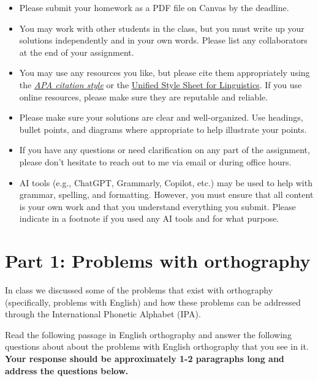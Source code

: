 \documentclass[12pt, letterpaper]{article}
\begin{document}
\begin{tcolorbox}[colback=LightGray!10!white,colframe=LightGray!75!black,title=Instructions]
    \begin{itemize}
        \item Please submit your homework as a PDF file on Canvas by the deadline.
        \item You may work with other students in the class, but you must write up your solutions independently and in your own words. Please list any collaborators at the end of your assignment.
        \item You may use any resources you like, but please cite them appropriately using the \href{https://apastyle.apa.org/}{\textit{APA citation style}} or the \href{https://langsci-press.org/unifiedstylesheet}{Unified Style Sheet for Linguistics}. If you use online resources, please make sure they are reputable and reliable.
        \item Please make sure your solutions are clear and well-organized. Use headings, bullet points, and diagrams where appropriate to help illustrate your points.
        \item If you have any questions or need clarification on any part of the assignment, please don't hesitate to reach out to me via email or during office hours.
        \item AI tools (e.g., ChatGPT, Grammarly, Copilot, etc.) may be used to help with grammar, spelling, and formatting. However, you must ensure that all content is your own work and that you understand everything you submit. Please indicate in a footnote if you used any AI tools and for what purpose.
    \end{itemize}
\end{tcolorbox}

\section*{Part 1: Problems with orthography} \label{sec:prob1}

In class we discussed some of the problems that exist with orthography (specifically, problems with English) and how these problems can be addressed through the International Phonetic Alphabet (IPA). 

Read the following passage in English orthography and answer the following questions about about the problems with English orthography that you see in it. \textbf{Your response should be approximately 1-2 paragraphs long and address the questions below.}
\end{document}
